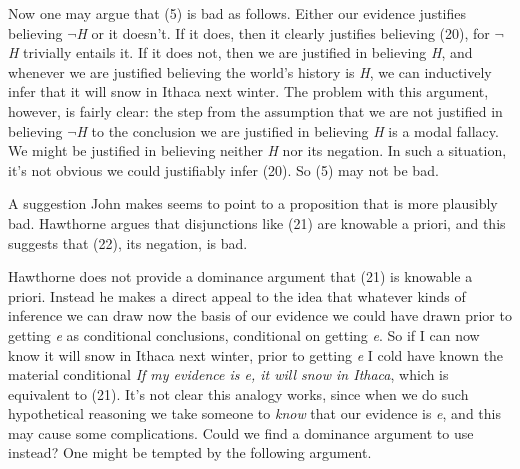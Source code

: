 \noindent Now one may argue that (5) is bad as follows. Either our evidence justifies believing \(\neg\)\textit{H} or it doesn't. If it does, then it clearly justifies believing (20), for \(\neg\)\textit{H} trivially entails it. If it does not, then we are justified in believing \textit{H}, and whenever we are justified believing the world's history is \textit{H}, we can inductively infer that it will snow in Ithaca next winter. The problem with this argument, however, is fairly clear: the step from the assumption that we are not justified in believing \(\neg\)\textit{H} to the conclusion we are justified in believing \textit{H} is a modal fallacy. We might be justified in believing neither \textit{H} nor its negation. In such a situation, it's not obvious we could justifiably infer (20). So (5) may not be bad.

A suggestion John \citet{Hawthorne2002} makes seems to point to a proposition that is more plausibly bad. Hawthorne argues that disjunctions like (21) are knowable a priori, and this suggests that (22), its negation, is bad.


\noindent Hawthorne does not provide a dominance argument that (21) is knowable a priori. Instead he makes a direct appeal to the idea that whatever kinds of inference we can draw now the basis of our evidence we could have drawn prior to getting \textit{e} as conditional conclusions, conditional on getting \textit{e}. So if I can now know it will snow in Ithaca next winter, prior to getting \textit{e} I cold have known the material conditional \textit{If my evidence is e, it will snow in Ithaca}, which is equivalent to (21). It's not clear this analogy works, since when we do such hypothetical reasoning we take someone to \textit{know} that our evidence is \textit{e}, and this may cause some complications. Could we find a dominance argument to use instead? One might be tempted by the following argument. 

\bigskip



